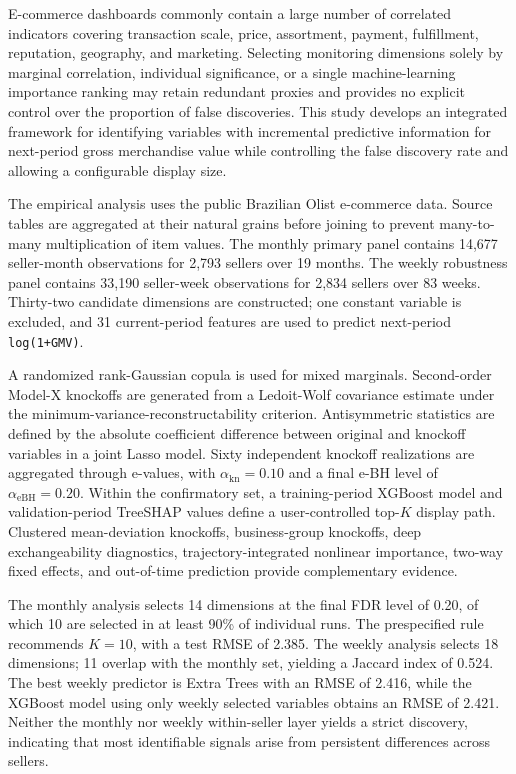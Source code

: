 \documentclass{sufethesismas}
\begin{document}
\begin{abstractEN}
E-commerce dashboards commonly contain a large number of correlated indicators covering transaction scale, price, assortment, payment, fulfillment, reputation, geography, and marketing. Selecting monitoring dimensions solely by marginal correlation, individual significance, or a single machine-learning importance ranking may retain redundant proxies and provides no explicit control over the proportion of false discoveries. This study develops an integrated framework for identifying variables with incremental predictive information for next-period gross merchandise value while controlling the false discovery rate and allowing a configurable display size.

The empirical analysis uses the public Brazilian Olist e-commerce data. Source tables are aggregated at their natural grains before joining to prevent many-to-many multiplication of item values. The monthly primary panel contains 14,677 seller-month observations for 2,793 sellers over 19 months. The weekly robustness panel contains 33,190 seller-week observations for 2,834 sellers over 83 weeks. Thirty-two candidate dimensions are constructed; one constant variable is excluded, and 31 current-period features are used to predict next-period \texttt{log(1+GMV)}.

A randomized rank-Gaussian copula is used for mixed marginals. Second-order Model-X knockoffs are generated from a Ledoit-Wolf covariance estimate under the minimum-variance-reconstructability criterion. Antisymmetric statistics are defined by the absolute coefficient difference between original and knockoff variables in a joint Lasso model. Sixty independent knockoff realizations are aggregated through e-values, with \(\alpha_{\mathrm{kn}}=0.10\) and a final e-BH level of \(\alpha_{\mathrm{eBH}}=0.20\). Within the confirmatory set, a training-period XGBoost model and validation-period TreeSHAP values define a user-controlled top-\(K\) display path. Clustered mean-deviation knockoffs, business-group knockoffs, deep exchangeability diagnostics, trajectory-integrated nonlinear importance, two-way fixed effects, and out-of-time prediction provide complementary evidence.

The monthly analysis selects 14 dimensions at the final FDR level of 0.20, of which 10 are selected in at least 90\% of individual runs. The prespecified rule recommends \(K=10\), with a test RMSE of 2.385. The weekly analysis selects 18 dimensions; 11 overlap with the monthly set, yielding a Jaccard index of 0.524. The best weekly predictor is Extra Trees with an RMSE of 2.416, while the XGBoost model using only weekly selected variables obtains an RMSE of 2.421. Neither the monthly nor weekly within-seller layer yields a strict discovery, indicating that most identifiable signals arise from persistent differences across sellers.


\end{abstractEN}
\end{document}

